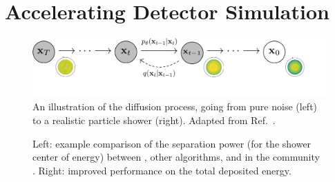 \section{Accelerating Detector Simulation}\label{sec:ml4sim}

\begin{figure}[htb!]
\centering
\includegraphics[width=0.95\myfigurewidth]{figures/pgm_diagram_xarrow_showers.pdf}
\caption{An illustration of the diffusion process, going from pure noise (left) to a realistic particle shower (right). Adapted from Ref.~\cite{Ho:2020}.}
\label{fig:illus}
\end{figure}

\begin{figure}[htb!]
\centering
{}
\caption{Left: example comparison of the separation power (for the shower center of energy) between \diffu, other algorithms, and \GEANTfour in the community \challenge.
Right: improved \diffu performance on the total deposited energy.}
\label{fig:calodiffu}
\end{figure}